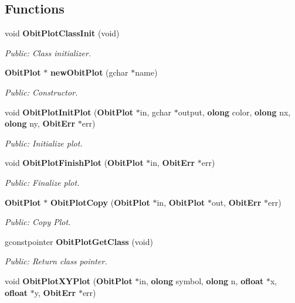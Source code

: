 \subsection*{Functions}
\begin{CompactItemize}
\item 
void {\bf Obit\-Plot\-Class\-Init} (void)
\begin{CompactList}\small\item\em Public: Class initializer. \item\end{CompactList}\item 
{\bf Obit\-Plot} $\ast$ {\bf new\-Obit\-Plot} (gchar $\ast$name)
\begin{CompactList}\small\item\em Public: Constructor. \item\end{CompactList}\item 
void {\bf Obit\-Plot\-Init\-Plot} ({\bf Obit\-Plot} $\ast$in, gchar $\ast$output, {\bf olong} color, {\bf olong} nx, {\bf olong} ny, {\bf Obit\-Err} $\ast$err)
\begin{CompactList}\small\item\em Public: Initialize plot. \item\end{CompactList}\item 
void {\bf Obit\-Plot\-Finish\-Plot} ({\bf Obit\-Plot} $\ast$in, {\bf Obit\-Err} $\ast$err)
\begin{CompactList}\small\item\em Public: Finalize plot. \item\end{CompactList}\item 
{\bf Obit\-Plot} $\ast$ {\bf Obit\-Plot\-Copy} ({\bf Obit\-Plot} $\ast$in, {\bf Obit\-Plot} $\ast$out, {\bf Obit\-Err} $\ast$err)
\begin{CompactList}\small\item\em Public: Copy Plot. \item\end{CompactList}\item 
gconstpointer {\bf Obit\-Plot\-Get\-Class} (void)
\begin{CompactList}\small\item\em Public: Return class pointer. \item\end{CompactList}\item 
void {\bf Obit\-Plot\-XYPlot} ({\bf Obit\-Plot} $\ast$in, {\bf olong} symbol, {\bf olong} n, {\bf ofloat} $\ast$x, {\bf ofloat} $\ast$y, {\bf Obit\-Err} $\ast$err)

\end{CompactItemize}
